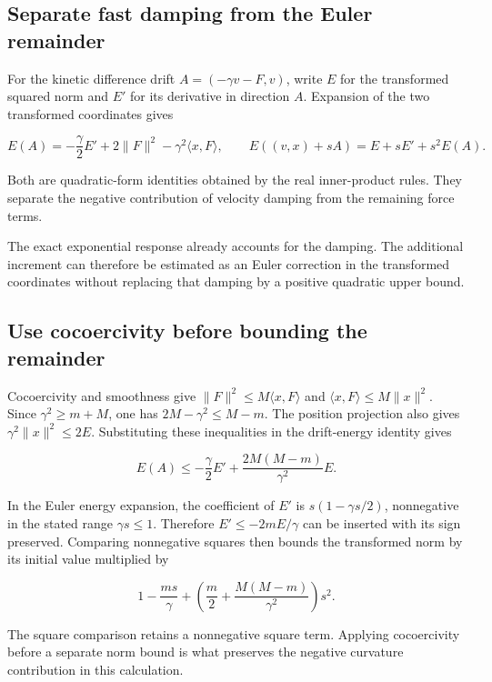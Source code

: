 \documentclass[11pt,a4paper]{report}
\begin{document}
\subsection{\texorpdfstring{Separate fast damping from the Euler remainder}{Separate fast damping from the Euler remainder}}
\label{report-step-KineticLangevin-SecondOrderLinear-lean-1}


For the kinetic difference drift \(A=(-\gamma v-F,v)\), write \(E\) for the transformed squared norm and \(E'\) for its derivative in direction \(A\). Expansion of the two transformed coordinates gives

\[E(A)=-\frac\gamma2E'+2\|F\|^2-\gamma^2\langle x,F\rangle,\qquad E((v,x)+sA)=E+sE'+s^2E(A).\]

Both are quadratic-form identities obtained by the real inner-product rules. They separate the negative contribution of velocity damping from the remaining force terms.



The exact exponential response already accounts for the damping. The additional increment can therefore be estimated as an Euler correction in the transformed coordinates without replacing that damping by a positive quadratic upper bound.

\subsection{\texorpdfstring{Use cocoercivity before bounding the remainder}{Use cocoercivity before bounding the remainder}}
\label{report-step-KineticLangevin-SecondOrderLinear-lean-2}


Cocoercivity and smoothness give \(\|F\|^2\le M\langle x,F\rangle\) and \(\langle x,F\rangle\le M\|x\|^2\). Since \(\gamma^2\ge m+M\), one has \(2M-\gamma^2\le M-m\). The position projection also gives \(\gamma^2\|x\|^2\le2E\). Substituting these inequalities in the drift-energy identity gives

\[E(A)\le-\frac\gamma2E'+\frac{2M(M-m)}{\gamma^2}E.\]

In the Euler energy expansion, the coefficient of \(E'\) is \(s(1-\gamma s/2)\), nonnegative in the stated range \(\gamma s\le1\). Therefore \(E'\le-2mE/\gamma\) can be inserted with its sign preserved. Comparing nonnegative squares then bounds the transformed norm by its initial value multiplied by

\[1-\frac{ms}{\gamma}+\left(\frac m2+\frac{M(M-m)}{\gamma^2}\right)s^2.\]

The square comparison retains a nonnegative square term. Applying cocoercivity before a separate norm bound is what preserves the negative curvature contribution in this calculation.
\end{document}
